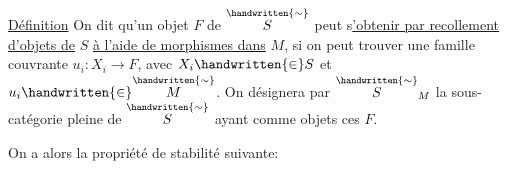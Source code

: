 \uline{Définition} On dit qu'un objet $F$ de $\overset{\handwritten{\sim}}{S}$ peut s\uline{'obtenir par recollement d'objets de} $S$ \uline{à l'aide de morphismes dans} $M$, si on peut trouver une famille couvrante $u_i:X_i\to F$, avec $X_i\handwritten{\in} S$ et $u_i\handwritten{\in} \overset{\handwritten{\sim}}{M}$. On désignera par $ {\overset{\handwritten{\sim}}{S}}_M$ la sous-catégorie pleine de $\overset{\handwritten{\sim}}{S}$ ayant comme objets ces $F$.

On a alors la propriété de stabilité suivante:



